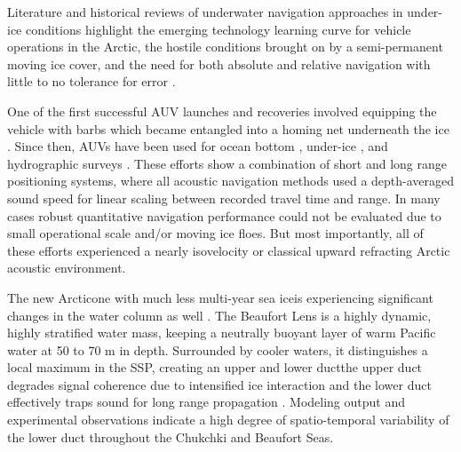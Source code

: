 Literature and historical reviews of underwater navigation approaches in under-ice conditions highlight the emerging technology learning curve for vehicle operations in the Arctic, the hostile conditions brought on by a semi-permanent moving ice cover, and the need for both absolute and relative navigation with little to no tolerance for error \citep{norgren_unmanned_2014,mcfarlane_autonomous_2015,barker_scientific_2020}.

One of the first successful AUV launches and recoveries involved equipping the vehicle with barbs which became entangled into a homing net underneath the ice \citep{bellingham_auv_1993}.
Since then, AUVs have been used for ocean bottom \citep{jakuba_long-baseline_2008,kunz_deep_2008}, under-ice \citep{kaminski_12_2010}, and hydrographic surveys \citep{kukulya_under-ice_2010,kukulya_development_2016,stevens_linking_2016,plueddemann_autonomous_2012}.
These efforts show a combination of short and long range positioning systems, where all acoustic navigation methods used a depth-averaged sound speed for linear scaling between recorded travel time and range.
In many cases robust quantitative navigation performance could not be evaluated due to small operational scale and/or moving ice floes.
But most importantly, all of these efforts experienced a nearly isovelocity or classical upward refracting Arctic acoustic environment.

The new Arctic\textemdash one with much less multi-year sea ice\textemdash is experiencing significant changes in the water column as well \citep{mackinnon_warm_2021}.
 The Beaufort Lens is a highly dynamic, highly stratified water mass, keeping a neutrally buoyant layer of warm Pacific water at 50 to 70 m in depth.
Surrounded by cooler waters, it distinguishes a local maximum in the SSP, creating an upper and lower duct\textemdash the upper duct degrades signal coherence due to intensified ice interaction and the lower duct effectively traps sound for long range propagation \citep{poulsen_acoustic_2016}. 
 Modeling output \citep{duda_long-range_2019,duda_effects_2021} and experimental observations \cite{kucukosmanoglu_observations_2021,badiey_azimuthal_2019,ballard_temporal_2020} indicate a high degree of spatio-temporal variability of the lower duct throughout the Chukchki and Beaufort Seas.

